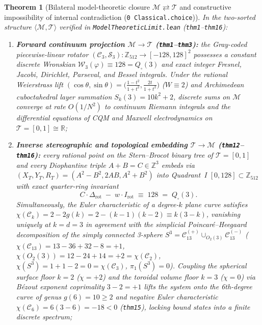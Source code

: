 \documentclass[11pt,a4paper]{article}
\newtheorem{theorem}{Theorem}[section]
\theoremstyle{definition}
\theoremstyle{remark}
\begin{document}
\begin{theorem}[Bilateral model-theoretic closure $\mathcal{M} \rightleftarrows \mathcal{T}$ and constructive impossibility of internal contradiction (\texttt{0 Classical.choice})]
\label{thm:bilateral-closure}
In the two-sorted structure $\langle\mathcal{M},\mathcal{T}\rangle$ verified in \texttt{ModelTheoreticLimit.lean} (\texttt{thm1}--\texttt{thm16}):
\begin{enumerate}[label=\textbf{(\roman*)},leftmargin=*]
\item \textbf{Forward continuum projection $\mathcal{M} \to \mathcal{T}$ (\texttt{thm1}--\texttt{thm3}):}
  the Gray-coded piecewise-linear rotator $(\mathcal{C}_3,\mathcal{S}_3) : \mathbb{Z}_{512}\to[-128,128]^2$ possesses a constant discrete Wronskian $\mathcal{W}_3(\varphi) \equiv 128 = Q_\square(3)$ and exact integer Fresnel, Jacobi, Dirichlet, Parseval, and Bessel integrals. Under the rational Weierstrass lift $(\cos\theta,\sin\theta) = \bigl(\frac{1-t^2}{1+t^2},\frac{2t}{1+t^2}\bigr)$ ($W\equiv 2$) and Archimedean cuboctahedral layer summation $S_k(3) = 10k^2 + 2$, discrete sums on $\mathcal{M}$ converge at rate $O(1/N^2)$ to continuum Riemann integrals and the differential equations of CQM and Maxwell electrodynamics on $\mathcal{T} = [0,1]\cong\mathbb{R}$;
\item \textbf{Inverse stereographic and topological embedding $\mathcal{T} \to \mathcal{M}$ (\texttt{thm12}--\texttt{thm16}):}
  every rational point on the Stern--Brocot binary tree of $\mathcal{T} = [0,1]$ and every Diophantine triple $A+B=C\in\mathbb{Z}^3$ embeds via $(X_T,Y_T,R_T) = (A^2-B^2,2AB,A^2+B^2)$ into Quadrant~I $[0,128]\subset\mathbb{Z}_{512}$ with exact quarter-ring invariant
  \begin{equation}
    \label{eq:quarter-ring-lock}
    C\cdot\Delta_{\mathrm{rot}} \;-\; w\cdot I_{\mathrm{rot}} \;\equiv\; 128 \;=\; Q_\square(3).
  \end{equation}
  Simultaneously, the Euler characteristic of a degree-$k$ plane curve satisfies $\chi(\mathcal{C}_k) = 2-2g(k) = 2-(k-1)(k-2) \equiv k(3-k)$, vanishing uniquely at $k = d = 3$ in agreement with the simplicial Poincar\'e--Heegaard decomposition of the simply connected 3-sphere $S^3 = \mathcal{C}_{13}^{(+)}\cup_{O_2(3)}\mathcal{C}_{13}^{(-)}$ ($\chi(\mathcal{C}_{13}) = 13-36+32-8 = +1$, $\chi(O_2(3)) = 12-24+14 = +2 = \chi(\mathcal{C}_2)$, $\chi(S^3) = 1+1-2 = 0 = \chi(\mathcal{C}_3)$, $\pi_1(S^3)=0$). Coupling the spherical surface floor $k=2$ ($\chi=+2$) and the toroidal volume floor $k=3$ ($\chi=0$) via Bézout exponent coprimality $3-2=+1$ lifts the system onto the 6th-degree curve of genus $g(6)=10\ge 2$ and negative Euler characteristic $\chi(\mathcal{C}_6) = 6(3-6) = -18 < 0$ (\texttt{thm15}), locking bound states into a finite discrete spectrum;

\end{enumerate}
\end{theorem}
\end{document}
